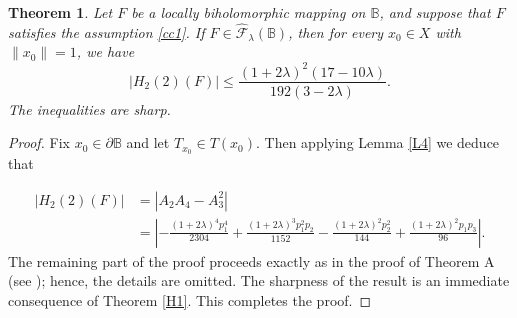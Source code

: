 \documentclass[11pt, reqno]{amsart}
\newtheorem{theo}{Theorem}[section]
\numberwithin{equation}{section}
\begin{document}
\begin{theo}\label{H2}
Let $F$ be a locally biholomorphic mapping on $\mathbb{B}$, and suppose that $F$ satisfies the assumption \eqref{cc1}. If $F\in \widehat{\mathcal{F}}_{\lambda}(\mathbb{B})$, then for every $x_0\in X$ with $\|x_0\|=1$, we have
\[
|H_{2}(2)(F)|\leq  \frac{(1+2\lambda)^2(17-10\lambda)}{192(3-2\lambda)}.
\] The inequalities are sharp.
\end{theo}
\begin{proof} Fix $x_0\in \partial{\mathbb{B}}$ and let $T_{x_0}\in T(x_0)$. Then applying Lemma \ref{L4} we deduce that 

\begin{align*}
|H_{2}(2)(F)|
&=|A_2A_4-A_3^2|\\
&=
\left|
-\frac{(1+2\lambda)^4p_1^4}{2304}
+\frac{(1+2\lambda)^3p_1^2p_2}{1152}
-\frac{(1+2\lambda)^2p_2^2}{144}
+\frac{(1+2\lambda)^2p_1p_3}{96}
\right|.
\end{align*}
The remaining part of the proof proceeds exactly as in the proof of Theorem A (see \cite[Theorem 3.1]{ALT2022}); hence, the details are omitted. The sharpness of the result is an immediate consequence of Theorem \ref{H1}. This completes the proof.\end{proof}
\end{document}
